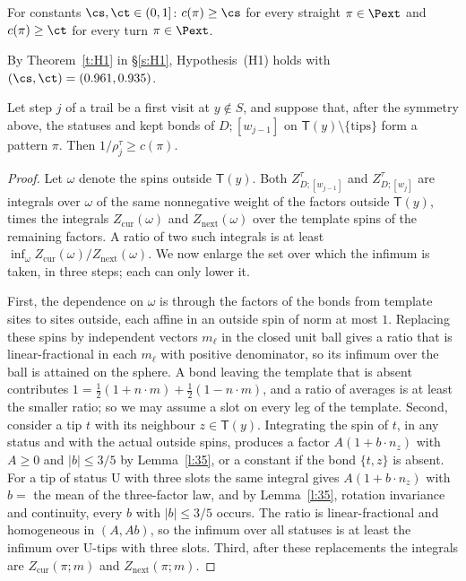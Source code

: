 \begin{hypothesis}[H1]\label{h:H1}
For constants $\cs, \ct \in (0, 1]$: $c(\pi) \ge \cs$ for every straight $\pi \in \Pext$ and $c(\pi) \ge \ct$ for every turn $\pi \in \Pext$.
\end{hypothesis}

By Theorem~\ref{t:H1} in \S\ref{s:H1}, Hypothesis~(H1) holds with $(\cs, \ct) = (0.961, 0.935)$.

\begin{lemma}\label{l:local}
Let step $j$ of a trail be a first visit at $y \notin S$, and suppose that, after the symmetry above, the statuses and kept bonds of $D;[w_{j - 1}]$ on $\mathsf T(y) \setminus \{\text{tips}\}$ form a pattern $\pi$. Then $1/\rho^\tau_j \ge c(\pi)$.
\end{lemma}

\begin{proof}
Let $\omega$ denote the spins outside $\mathsf T(y)$. Both $Z^\tau_{D;[w_{j - 1}]}$ and $Z^\tau_{D;[w_j]}$ are integrals over $\omega$ of the same nonnegative weight of the factors outside $\mathsf T(y)$, times the integrals $Z_{\mathrm{cur}}(\omega)$ and $Z_{\mathrm{next}}(\omega)$ over the template spins of the remaining factors. A ratio of two such integrals is at least $\inf_\omega Z_{\mathrm{cur}}(\omega)/Z_{\mathrm{next}}(\omega)$. We now enlarge the set over which the infimum is taken, in three steps; each can only lower it.

First, the dependence on $\omega$ is through the factors of the bonds from template sites to sites outside, each affine in an outside spin of norm at most $1$. Replacing these spins by independent vectors $m_\ell$ in the closed unit ball gives a ratio that is linear-fractional in each $m_\ell$ with positive denominator, so its infimum over the ball is attained on the sphere. A bond leaving the template that is absent contributes $1 = \frac12 (1 + n \cdot m) + \frac12 (1 - n \cdot m)$, and a ratio of averages is at least the smaller ratio; so we may assume a slot on every leg of the template. Second, consider a tip $t$ with its neighbour $z \in \mathsf T(y)$. Integrating the spin of $t$, in any status and with the actual outside spins, produces a factor $A (1 + b \cdot n_z)$ with $A \ge 0$ and $|b| \le 3/5$ by Lemma~\ref{l:35}, or a constant if the bond $\{t, z\}$ is absent. For a tip of status $\mathrm U$ with three slots the same integral gives $A(1 + b \cdot n_z)$ with $b = $ the mean of the three-factor law, and by Lemma~\ref{l:35}, rotation invariance and continuity, every $b$ with $|b| \le 3/5$ occurs. The ratio is linear-fractional and homogeneous in $(A, A b)$, so the infimum over all statuses is at least the infimum over $\mathrm U$-tips with three slots. Third, after these replacements the integrals are $Z_{\mathrm{cur}}(\pi; m)$ and $Z_{\mathrm{next}}(\pi; m)$.
\end{proof}


